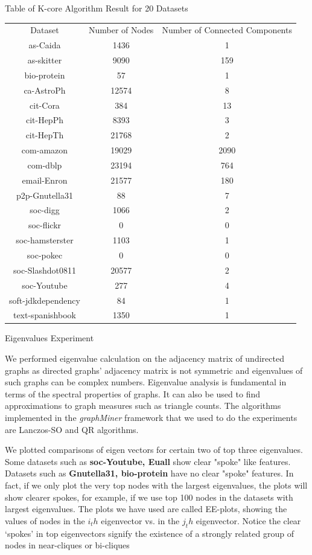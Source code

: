 \begin{center}
Table of K-core Algorithm Result for 20 Datasets
\begin{tabular}{ |c|c|c| }
 \hline
 Dataset & Number of Nodes & Number of Connected Components \\
  as-Caida & 1436 & 1 \\
  as-skitter & 9090 & 159 \\
  bio-protein & 57 & 1 \\
  ca-AstroPh & 12574 & 8 \\
  cit-Cora & 384 & 13 \\
  cit-HepPh & 8393 & 3 \\
  cit-HepTh & 21768 & 2 \\
  com-amazon & 19029 & 2090 \\
  com-dblp & 23194 & 764 \\
  email-Enron & 21577 & 180 \\
  p2p-Gnutella31 & 88 & 7 \\
  soc-digg & 1066 & 2 \\
  soc-flickr & 0 & 0 \\
  soc-hamsterster & 1103 & 1 \\
  soc-pokec & 0 & 0 \\
  soc-Slashdot0811 & 20577 & 2 \\
  soc-Youtube & 277 & 4 \\
  soft-jdkdependency & 84 & 1 \\
  text-spanishbook & 1350 & 1 \\
 \hline
\end{tabular}
\end{center}


Eigenvalues Experiment

We performed eigenvalue calculation on the adjacency matrix of undirected graphs as directed graphs' adjacency matrix is not symmetric and eigenvalues of such graphs can be complex numbers. Eigenvalue analysis is fundamental in terms of the spectral properties of graphs. It can also be used to find approximations to graph measures such as triangle counts.  The algorithms implemented in the {\em graphMiner} framework that we used to do the experiments are Lanczos-SO and QR algorithms.

We plotted comparisons of eigen vectors for certain two of top three eigenvalues. Some datasets such as \textbf{soc-Youtube, Euall} show clear "spoke" like features. Datasets such as \textbf{Gnutella31, bio-protein} have no clear "spoke" features. In fact, if we only plot the very top nodes with the largest eigenvalues, the plots will show clearer spokes, for example, if we use top 100 nodes in the datasets with largest eigenvalues. The plots we have used are called EE-plots, showing the values of nodes in the $i_th$ eigenvector vs. in the $j_th$ eigenvector. Notice the clear ‘spokes’ in top eigenvectors signify the existence of a strongly related group of nodes in near-cliques or bi-cliques


